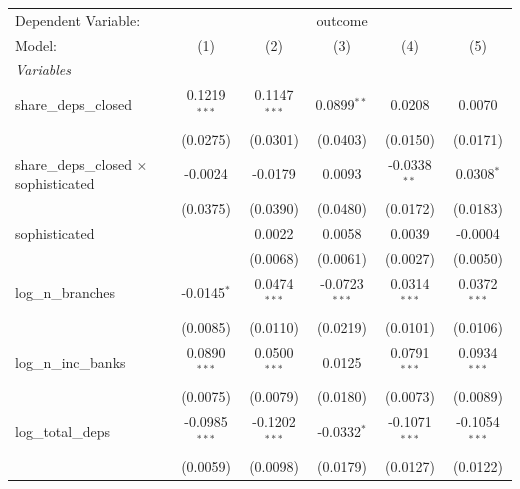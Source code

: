 \begingroup
\centering
\begin{tabular}{lccccc}
   \tabularnewline \midrule \midrule
   Dependent Variable: & \multicolumn{5}{c}{outcome}\\
   Model:                                        & (1)             & (2)             & (3)             & (4)             & (5)\\  
   \midrule
   \emph{Variables}\\
   share\_deps\_closed                           & 0.1219$^{***}$  & 0.1147$^{***}$  & 0.0899$^{**}$   & 0.0208          & 0.0070\\   
                                                 & (0.0275)        & (0.0301)        & (0.0403)        & (0.0150)        & (0.0171)\\   
   share\_deps\_closed $\times$ sophisticated    & -0.0024         & -0.0179         & 0.0093          & -0.0338$^{**}$  & 0.0308$^{*}$\\   
                                                 & (0.0375)        & (0.0390)        & (0.0480)        & (0.0172)        & (0.0183)\\   
   sophisticated                                 &                 & 0.0022          & 0.0058          & 0.0039          & -0.0004\\   
                                                 &                 & (0.0068)        & (0.0061)        & (0.0027)        & (0.0050)\\   
   log\_n\_branches                              & -0.0145$^{*}$   & 0.0474$^{***}$  & -0.0723$^{***}$ & 0.0314$^{***}$  & 0.0372$^{***}$\\   
                                                 & (0.0085)        & (0.0110)        & (0.0219)        & (0.0101)        & (0.0106)\\   
   log\_n\_inc\_banks                            & 0.0890$^{***}$  & 0.0500$^{***}$  & 0.0125          & 0.0791$^{***}$  & 0.0934$^{***}$\\   
                                                 & (0.0075)        & (0.0079)        & (0.0180)        & (0.0073)        & (0.0089)\\   
   log\_total\_deps                              & -0.0985$^{***}$ & -0.1202$^{***}$ & -0.0332$^{*}$   & -0.1071$^{***}$ & -0.1054$^{***}$\\   
                                                 & (0.0059)        & (0.0098)        & (0.0179)        & (0.0127)        & (0.0122)\\   

\end{tabular}
